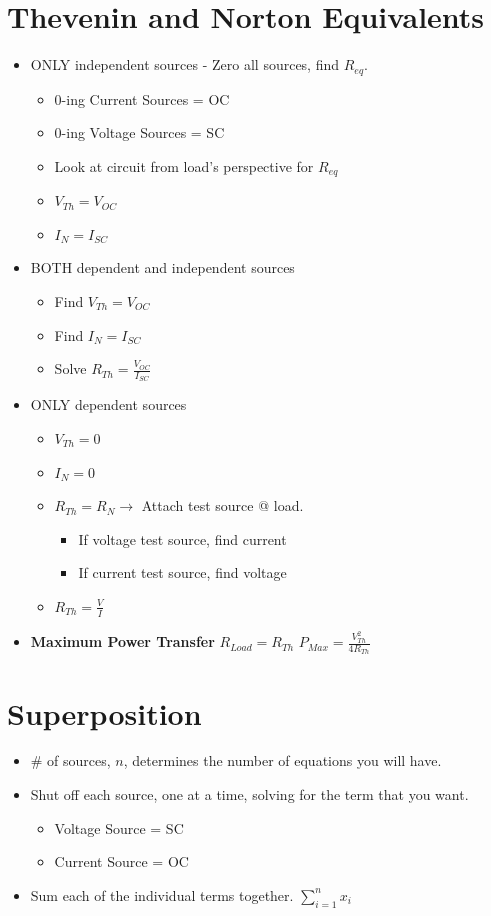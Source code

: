 \documentclass[10pt,letterpaper,final,twoside,notitlepage]{article}
\begin{document}
\section*{Thevenin and Norton Equivalents}
	\begin{itemize}
		\item ONLY independent sources - Zero all sources, find $R_{eq}$.
		\begin{itemize}
			\item 0-ing Current Sources = OC
			\item 0-ing Voltage Sources = SC
			\item Look at circuit from load's perspective for $R_{eq}$
			\item $V_{Th}=V_{OC}$
			\item $I_{N} = I_{SC}$
		\end{itemize}
		\item BOTH dependent and independent sources
			\begin{itemize}
				\item Find $V_{Th}=V_{OC}$
				\item Find $I_{N}=I_{SC}$
				\item Solve $R_{Th}=\frac{V_{OC}}{I_{SC}}$
			\end{itemize}
		\item ONLY dependent sources
			\begin{itemize}
				\item $V_{Th}=0$
				\item $I_{N}=0$
				\item $R_{Th}=R_{N} \rightarrow$ Attach test source @ load.
				\begin{itemize}
					\item If voltage test source, find current
					\item If current test source, find voltage
				\end{itemize}
				\item $R_{Th}=\frac{V}{I}$
			\end{itemize}
		\item \textbf{Maximum Power Transfer} \newline
			$R_{Load}=R_{Th}$ \newline \newline
			$P_{Max}=\frac{V_{Th}^2}{4R_{Th}}$
	\end{itemize}

\section*{Superposition}
	\begin{itemize}
		\item \# of sources, $n$, determines the number of equations you will have.
		\item Shut off each source, one at a time, solving for the term that you want.
		\begin{itemize}
			\item Voltage Source = SC
			\item Current Source = OC
		\end{itemize}
		\item Sum each of the individual terms together. $\sum_{i=1}^{n} x_{i}$
	\end{itemize}
\end{document}
